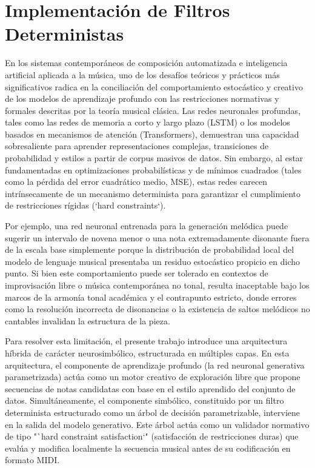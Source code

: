 \section{Implementación de Filtros Deterministas}

En los sistemas contemporáneos de composición automatizada e inteligencia artificial aplicada a la música, uno de los desafíos teóricos y prácticos más significativos radica en la conciliación del comportamiento estocástico y creativo de los modelos de aprendizaje profundo con las restricciones normativas y formales descritas por la teoría musical clásica. Las redes neuronales profundas, tales como las redes de memoria a corto y largo plazo (LSTM) o los modelos basados en mecanismos de atención (Transformers), demuestran una capacidad sobresaliente para aprender representaciones complejas, transiciones de probabilidad y estilos a partir de corpus masivos de datos. Sin embargo, al estar fundamentadas en optimizaciones probabilísticas y de mínimos cuadrados (tales como la pérdida del error cuadrático medio, MSE), estas redes carecen intrínsecamente de un mecanismo determinista para garantizar el cumplimiento de restricciones rígidas (`hard constraints`). 

Por ejemplo, una red neuronal entrenada para la generación melódica puede sugerir un intervalo de novena menor o una nota extremadamente disonante fuera de la escala base simplemente porque la distribución de probabilidad local del modelo de lenguaje musical presentaba un residuo estocástico propicio en dicho punto. Si bien este comportamiento puede ser tolerado en contextos de improvisación libre o música contemporánea no tonal, resulta inaceptable bajo los marcos de la armonía tonal académica y el contrapunto estricto, donde errores como la resolución incorrecta de disonancias o la existencia de saltos melódicos no cantables invalidan la estructura de la pieza.

Para resolver esta limitación, el presente trabajo introduce una arquitectura híbrida de carácter neurosimbólico, estructurada en múltiples capas. En esta arquitectura, el componente de aprendizaje profundo (la red neuronal generativa parametrizada) actúa como un motor creativo de exploración libre que propone secuencias de notas candidatas con base en el estilo aprendido del conjunto de datos. Simultáneamente, el componente simbólico, constituido por un filtro determinista estructurado como un árbol de decisión parametrizable, interviene en la salida del modelo generativo. Este árbol actúa como un validador normativo de tipo "`hard constraint satisfaction`" (satisfacción de restricciones duras) que evalúa y modifica localmente la secuencia musical antes de su codificación en formato MIDI.

